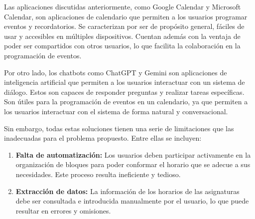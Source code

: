 



Las aplicaciones discutidas anteriormente, como Google Calendar y Microsoft Calendar, son aplicaciones de calendario que permiten a los usuarios programar eventos y recordatorios. Se caracterizan por ser de propósito general, fáciles de usar y accesibles en múltiples dispositivos. Cuentan además con la ventaja de poder ser compartidos con otros usuarios, lo que facilita la colaboración en la programación de eventos.\newline

Por otro lado, los chatbots como ChatGPT y Gemini son aplicaciones de inteligencia artificial que permiten a los usuarios interactuar con un sistema de diálogo. Estos son capaces de responder preguntas y realizar tareas específicas. Son útiles para la programación de eventos en un calendario, ya que permiten a los usuarios interactuar con el sistema de forma natural y conversacional.\newline

Sin embargo, todas estas soluciones tienen una serie de limitaciones que las inadecuadas para el problema propuesto. Entre ellas se incluyen:

\begin{enumerate}
    \item \textbf{Falta de automatización:} Los usuarios deben participar activamente en la organización de bloques para poder conformar el horario que se adecue a sus necesidades. Este proceso resulta ineficiente y tedioso.
    \item \textbf{Extracción de datos:} La información de los horarios de las asignaturas debe ser consultada e introducida manualmente por el usuario, lo que puede resultar en errores y omisiones.
\end{enumerate}